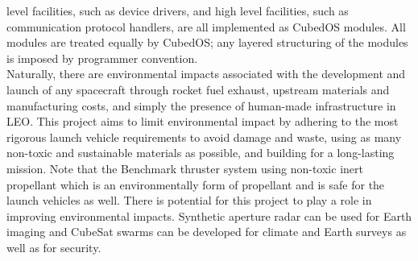 level facilities, such as device drivers, and high level facilities,
such as communication protocol handlers, are all implemented as
CubedOS modules. All modules are treated equally by CubedOS; any
layered structuring of the modules is imposed by programmer
convention.
\\
Naturally, there are environmental impacts associated with the development and launch of any spacecraft through rocket fuel exhaust, upstream materials and manufacturing costs, and simply the presence of human-made infrastructure in LEO. This project aims to limit environmental impact by adhering to the most rigorous launch vehicle requirements to avoid damage and waste, using as many non-toxic and sustainable materials as possible, and building for a long-lasting mission. Note that the Benchmark thruster system using non-toxic inert propellant which is an environmentally form of propellant and is safe for the launch vehicles as well. There is potential for this project to play a role in improving environmental impacts. Synthetic aperture radar can be used for Earth imaging and CubeSat swarms can be developed for climate and Earth surveys as well as for security.
\pagebreak
